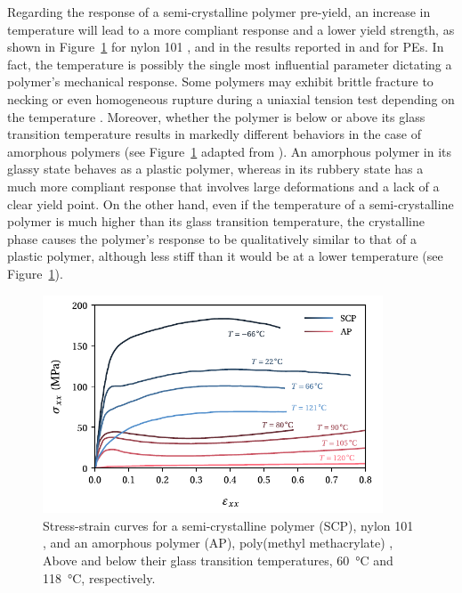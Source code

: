 Regarding the response of a semi-crystalline polymer pre-yield, an increase in temperature will lead to a more compliant response and a lower yield strength, as shown in Figure~\ref{fig:scheme_effect_temperature} for nylon 101 \citep{khanThermomechanicalResponseNylon2006}, and in the results reported in \cite{brownInfluenceMolecularConformation2007} and \cite{hobeikaTemperatureStrainRate2000} for PEs.
In fact, the temperature is possibly the single most influential parameter dictating a polymer's mechanical response.
Some polymers may exhibit brittle fracture to necking or even homogeneous rupture during a uniaxial tension test depending on the temperature \citep{wardIntroductionMechanicalProperties2004}.
Moreover, whether the polymer is below or above its glass transition temperature results in markedly different behaviors in the case of amorphous polymers (see Figure~\ref{fig:scheme_effect_temperature} adapted from \cite{vanloockDeformationFailureMaps2018}).
An amorphous polymer in its glassy state behaves as a plastic polymer, whereas in its rubbery state has a much more compliant response that involves large deformations and a lack of a clear yield point.
On the other hand, even if the temperature of a semi-crystalline polymer is much higher than its glass transition temperature, the crystalline phase causes the polymer's response to be qualitatively similar to that of a plastic polymer, although less stiff than it would be at a lower temperature (see Figure~\ref{fig:scheme_effect_temperature}).
\begin{figure}[hbtp]
    \centering
    \includegraphics[width=0.9\textwidth]{figures/scheme_effect_temperature}
    \caption{Stress-strain curves for a semi-crystalline polymer (SCP), nylon 101 \citep{khanThermomechanicalResponseNylon2006}, and an amorphous polymer (AP), poly(methyl methacrylate) \citep{vanloockDeformationFailureMaps2018}, Above and below their glass transition temperatures, \SI{60}{\celsius} and \SI{118}{\celsius}, respectively.}
\label{fig:scheme_effect_temperature}
\end{figure}

